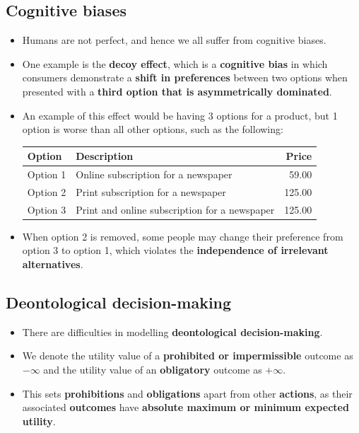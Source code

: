 \documentclass[11pt]{article}
\begin{document}
\subsection{Cognitive biases}
\label{sec:orgeff0836}
\begin{itemize}
\item Humans are not perfect, and hence we all suffer from cognitive biases.
\item One example is the \textbf{decoy effect}, which is a \textbf{cognitive bias} in which consumers demonstrate a \textbf{shift in preferences} between two options when presented with a \textbf{third option that is asymmetrically dominated}.
\item An example of this effect would be having 3 options for a product, but 1 option is worse than all other options, such as the following:
\begin{center}
\begin{tabular}{l|l|r}
Option & Description & Price\\
\hline
Option 1 & Online subscription for a newspaper & 59.00\\
Option 2 & Print subscription for a newspaper & 125.00\\
Option 3 & Print and online subscription for a newspaper & 125.00\\
\end{tabular}
\end{center}

\item When option 2 is removed, some people may change their preference from option 3 to option 1, which violates the \textbf{independence of irrelevant alternatives}.
\end{itemize}
\subsection{Deontological decision-making}
\label{sec:orgd564832}
\begin{itemize}
\item There are difficulties in modelling \textbf{deontological decision-making}.
\item We denote the utility value of a \textbf{prohibited or impermissible} outcome as \(-\infty\) and the utility value of an \textbf{obligatory} outcome as \(+\infty\).
\item This sets \textbf{prohibitions} and \textbf{obligations} apart from other \textbf{actions}, as their associated \textbf{outcomes} have \textbf{absolute maximum or minimum expected utility}.
\end{itemize}
\end{document}
